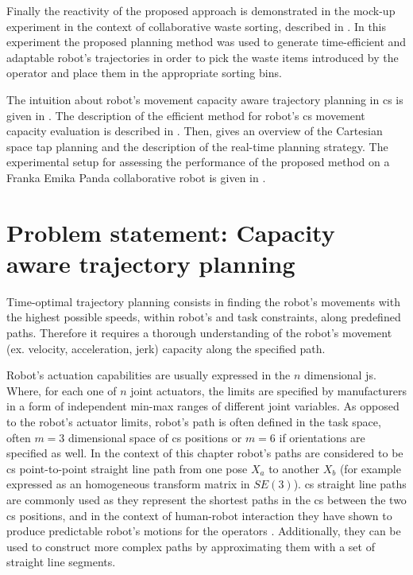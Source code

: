 Finally the reactivity of the proposed approach is demonstrated in the mock-up experiment in the context of collaborative waste sorting, described in . In this experiment the proposed planning method was used to generate time-efficient and adaptable robot's trajectories in order to pick the waste items introduced by the operator and place them in the appropriate sorting bins.

The intuition about robot's movement capacity aware trajectory planning in \gls{cs} is given in . 
The description of the efficient method for robot's \gls{cs} movement capacity evaluation is described in . 
Then,  gives an overview of the Cartesian space \gls{tap} planning and the description of the real-time planning strategy. 
The experimental setup for assessing the performance of the proposed method on a Franka Emika Panda collaborative robot is given in . 




\section{Problem statement: Capacity aware trajectory planning}\label{ch:problem_statement}

Time-optimal trajectory planning consists in finding the robot's movements with the highest possible speeds, within robot's and task constraints, along predefined paths. 
Therefore it requires a thorough understanding of the robot's movement (ex. velocity, acceleration, jerk) capacity along the specified path. 

Robot's actuation capabilities are usually expressed in the $n$ dimensional \gls{js}. 
Where, for each one of $n$ joint actuators, the limits are specified by manufacturers in a form of independent min-max ranges of different joint variables. 
As opposed to the robot's actuator limits, robot's path is often defined in the task space, often $m=3$ dimensional space of \gls{cs} positions or $m=6$ if orientations are specified as well. 
In the context of this chapter robot's paths are considered to be \gls{cs} point-to-point straight line path from one pose $X_a$ to another $X_b$ (for example expressed as an homogeneous transform matrix in $SE(3)$). \gls{cs} straight line paths are commonly used as they represent the shortest paths in the \gls{cs} between the two \gls{cs} positions, and in the context of human-robot interaction they have shown to produce predictable robot's motions for the operators \cite{Dragan2013Legibility}. Additionally, they can be used to construct more complex paths by approximating them with a set of straight line segments.


